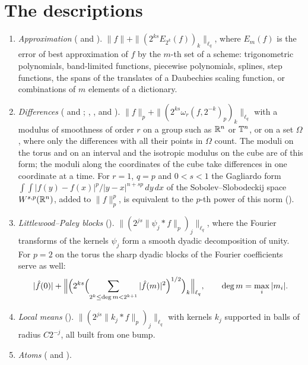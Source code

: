 \section{The descriptions}
\label{sec:descriptions}

\begin{enumerate}
  \item \emph{Approximation} ( and ).
    $\|f\| + \|(2^{ks} E_{2^k}(f))_k\|_{\ell_q}$, where $E_m(f)$ is the error of best
    approximation of $f$ by the $m$-th set of a scheme: trigonometric polynomials, band-limited
    functions, piecewise polynomials, splines, step functions, the spans of the translates of a
    Daubechies scaling function, or combinations of $m$ elements of a dictionary.
  \item \emph{Differences} ( and ;
    , ,  and
    ).
    $\|f\|_p + \|(2^{ks} \omega_r(f, 2^{-k})_p)_k\|_{\ell_q}$ with a modulus of smoothness of
    order $r$ on a group such as $\mathbb{R}^n$ or $\mathbb{T}^n$, or on a set $\Omega$, where only the
    differences with all their points in $\Omega$ count. The moduli on the torus and on an interval
    and the isotropic modulus on the cube are of this form; the moduli along the coordinates of the
    cube take differences in one coordinate at a time. For $r = 1$, $q = p$ and $0 < s < 1$ the
    Gagliardo form $\int\!\int |f(y) - f(x)|^p / |y - x|^{n + sp} \, dy \, dx$ of the
    Sobolev--Slobodeckij space $W^{s,p}(\mathbb{R}^n)$, added to $\|f\|_p^p$, is equivalent to the
    $p$-th power of this norm ().
  \item \emph{Littlewood--Paley blocks} ().
    $\|(2^{js} \|\psi_j * f\|_p)_j\|_{\ell_q}$, where the Fourier transforms of the kernels
    $\psi_j$ form a smooth dyadic decomposition of unity. For $p = 2$ on the torus the sharp
    dyadic blocks of the Fourier coefficients serve as well:
    \[
      |\hat f(0)| + \Bigl\|\Bigl(2^{ks} \Bigl(\sum_{2^k \leq \deg m < 2^{k+1}} |\hat f(m)|^2
        \Bigr)^{1/2}\Bigr)_k\Bigr\|_{\ell_q},
      \qquad \deg m = \max_i |m_i| .
    \]
  \item \emph{Local means} ().
    $\|(2^{js} \|k_j * f\|_p)_j\|_{\ell_q}$ with kernels $k_j$ supported in balls of radius
    $C 2^{-j}$, all built from one bump.
  \item \emph{Atoms} ( and ).

\end{enumerate}
